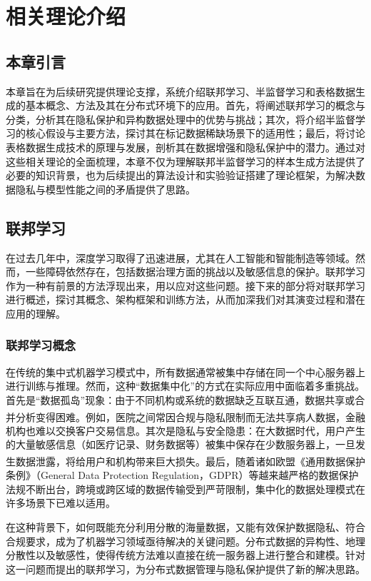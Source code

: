 \chapter{相关理论介绍}
\thispagestyle{others}
\pagestyle{others}
\xiaosi

\section{本章引言}
本章旨在为后续研究提供理论支撑，系统介绍联邦学习、半监督学习和表格数据生成的基本概念、方法及其在分布式环境下的应用。首先，将阐述联邦学习的概念与分类，分析其在隐私保护和异构数据处理中的优势与挑战；其次，将介绍半监督学习的核心假设与主要方法，探讨其在标记数据稀缺场景下的适用性；最后，将讨论表格数据生成技术的原理与发展，剖析其在数据增强和隐私保护中的潜力。通过对这些相关理论的全面梳理，本章不仅为理解联邦半监督学习的样本生成方法提供了必要的知识背景，也为后续提出的算法设计和实验验证搭建了理论框架，为解决数据隐私与模型性能之间的矛盾提供了思路。

\section{联邦学习}
在过去几年中，深度学习取得了迅速进展，尤其在人工智能和智能制造等领域。然而，一些障碍依然存在，包括数据治理方面的挑战以及敏感信息的保护。联邦学习作为一种有前景的方法浮现出来，用以应对这些问题。接下来的部分将对联邦学习进行概述，探讨其概念、架构框架和训练方法，从而加深我们对其演变过程和潜在应用的理解。
\subsection{联邦学习概念}
在传统的集中式机器学习模式中，所有数据通常被集中存储在同一个中心服务器上进行训练与推理。然而，这种“数据集中化”的方式在实际应用中面临着多重挑战。首先是“数据孤岛”现象：由于不同机构或系统的数据缺乏互联互通，数据共享或合并分析变得困难\textsuperscript{\cite{yang2019federated}}。例如，医院之间常因合规与隐私限制而无法共享病人数据，金融机构也难以交换客户交易信息。其次是隐私与安全隐患：在大数据时代，用户产生的大量敏感信息（如医疗记录、财务数据等）被集中保存在少数服务器上，一旦发生数据泄露，将给用户和机构带来巨大损失\textsuperscript{\cite{mcmahan2017communication}}。最后，随着诸如欧盟《通用数据保护条例》（General Data Protection Regulation，GDPR）等越来越严格的数据保护法规不断出台，跨境或跨区域的数据传输受到严苛限制，集中化的数据处理模式在许多场景下已难以适用。

在这种背景下，如何既能充分利用分散的海量数据，又能有效保护数据隐私、符合合规要求，成为了机器学习领域亟待解决的关键问题。分布式数据的异构性、地理分散性以及敏感性，使得传统方法难以直接在统一服务器上进行整合和建模。针对这一问题而提出的联邦学习，为分布式数据管理与隐私保护提供了新的解决思路。

